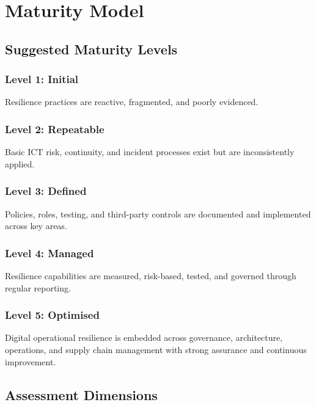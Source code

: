 \documentclass[
  letterpaper,
  DIV=11,
  numbers=noendperiod]{scrartcl}
\begin{document}
\section{Maturity Model}\label{maturity-model}

\subsection{Suggested Maturity Levels}\label{suggested-maturity-levels}

\subsubsection{Level 1: Initial}\label{level-1-initial}

Resilience practices are reactive, fragmented, and poorly evidenced.

\subsubsection{Level 2: Repeatable}\label{level-2-repeatable}

Basic ICT risk, continuity, and incident processes exist but are
inconsistently applied.

\subsubsection{Level 3: Defined}\label{level-3-defined}

Policies, roles, testing, and third-party controls are documented and
implemented across key areas.

\subsubsection{Level 4: Managed}\label{level-4-managed}

Resilience capabilities are measured, risk-based, tested, and governed
through regular reporting.

\subsubsection{Level 5: Optimised}\label{level-5-optimised}

Digital operational resilience is embedded across governance,
architecture, operations, and supply chain management with strong
assurance and continuous improvement.

\subsection{Assessment Dimensions}\label{assessment-dimensions}
\end{document}
